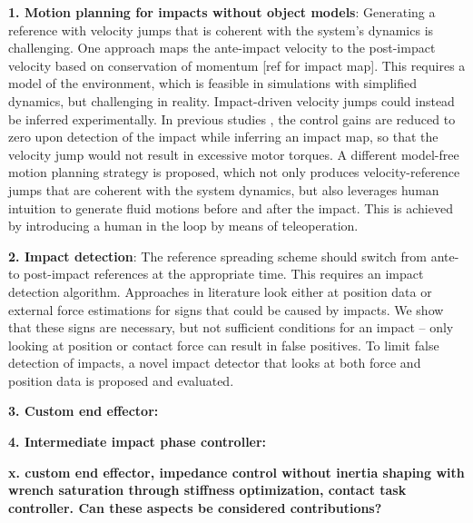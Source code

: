 \documentclass[a4paper, 10pt, conference]{ieeeconf}
\begin{document}
    \textbf{1. Motion planning for impacts without object models}: Generating a reference with velocity jumps that is coherent with the system’s dynamics is challenging. 
    One approach maps the ante-impact velocity to the post-impact velocity based on conservation of momentum [ref for impact map]. This requires a model of the environment, which is feasible in simulations with simplified dynamics, but challenging in reality.
    Impact-driven velocity jumps could instead be inferred experimentally. In previous studies \cite{aouajPredictingPostImpactVelocity2021}, the control gains are reduced to zero upon detection of the impact while inferring an impact map, so that the velocity jump would not result in excessive motor torques.
    A different model-free motion planning strategy is proposed, which not only produces velocity-reference jumps that are coherent with the system dynamics, but also leverages human intuition to generate fluid motions before and after the impact. This is achieved by introducing a human in the loop by means of teleoperation. %

    \textbf{2. Impact detection}: The reference spreading scheme should switch from ante- to post-impact references at the appropriate time. This requires an impact detection algorithm. Approaches in literature look either at position data \cite{rijnenMotionSignalsVelocity2018} or external force estimations \cite{uitendaalTeachingRobotsInteraction2022,properAimAwareCollisionMonitoring2021,properValidationNumericalSimultaneous2022} for signs that could be caused by impacts. We show that these signs are necessary, but not sufficient conditions for an impact -- only looking at position or contact force can result in false positives. To limit false detection of impacts, a novel impact detector that looks at both force and position data is proposed and evaluated.

    \textbf{3. Custom end effector:}

    \textbf{4. Intermediate impact phase controller:}

    \textbf{x. custom end effector, impedance control without inertia shaping with wrench saturation through stiffness optimization, contact task controller. Can these aspects be considered contributions?}
\end{document}
